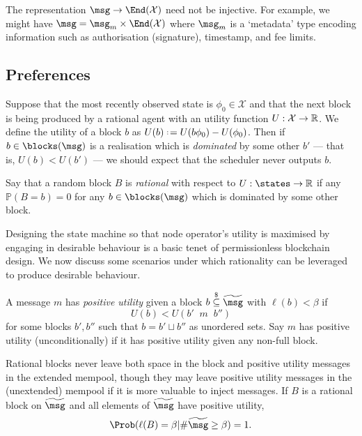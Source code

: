 \documentclass[a4paper,11pt]{article}
\newcommand \cat {\mathop{|\!|}}
\begin{document}
\begin{example}[Metadata]

  The representation $\msg \rightarrow \End(\mathcal{X})$ need not be injective. For example, we might have $\msg = \msg_m\times\End(\mathcal{X})$ where $\msg_m$ is a `metadata' type encoding information such as authorisation (signature), timestamp, and fee limits.

\end{example}




\subsection{Preferences}
Suppose that the most recently observed state is $\phi_0\in\mathcal{X}$ and that the next block is being produced by a rational agent with an utility function $U:\mathcal{X}\rightarrow\mathbb R$. 
%
We define the utility of a block $b$ as $U(b)\defeq U(b\phi_0) - U(\phi_0)$.
%
Then if $b\in\blocks(\msg)$ is a realisation which is \emph{dominated} by some other $b'$ --- that is, $U(b) < U(b')$ --- we should expect that the scheduler never outputs $b$.

\begin{definition}[Rationality]
\label{rational}

  Say that a random block $B$ is \emph{rational} with respect to $U:\states\rightarrow\R$ if any $\mathbb{P}(B=b)=0$ for any $b\in\blocks(\msg)$ which is dominated by some other block.

\end{definition}

Designing the state machine so that node operator's utility is maximised by engaging in desirable behaviour is a basic tenet of permissionless blockchain design.
%
We now discuss some scenarios under which rationality can be leveraged to produce desirable behaviour.


\begin{example}
\label{positive-utility}

  A message $m$ has \emph{positive utility} given a block $b\stackrel{\$}{\subseteq}\widetilde\msg$ with $\ell(b)<\beta$ if 
  \[
    U(b) < U(b' \cat m\cat b'')
  \]
  for some blocks $b',b''$ such that $b = b'\sqcup b''$ as unordered sets.
  Say $m$ has positive utility (unconditionally) if it has positive utility given any non-full block.
  
  Rational blocks never leave both space in the block and positive utility messages in the extended mempool, though they may leave positive utility messages in the (unextended) mempool if it is more valuable to inject messages.
  If $B$ is a rational block on $\widetilde\msg$ and all elements of $\widetilde\msg$ have positive utility,
  \[
    \Prob(\ell(B)=\beta | \#\widetilde\msg \geq \beta ) = 1.
  \]
  
\end{example}
\end{document}
